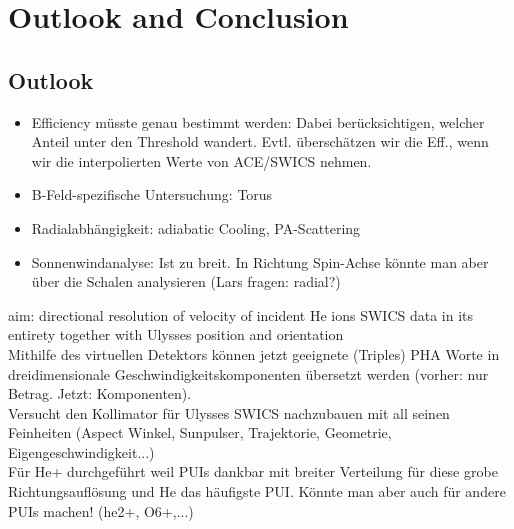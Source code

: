 
\chapter{Outlook and Conclusion} %

\label{chap:concl} %


\section{Outlook}
\begin{itemize}
	\item Efficiency müsste genau bestimmt werden: Dabei berücksichtigen, welcher Anteil unter den Threshold wandert. Evtl. überschätzen wir die Eff., wenn wir die interpolierten Werte von ACE/SWICS nehmen.
	\item B-Feld-spezifische Untersuchung: Torus
	\item Radialabhängigkeit: adiabatic Cooling, PA-Scattering
	\item Sonnenwindanalyse: Ist zu breit. In Richtung Spin-Achse könnte man aber über die Schalen analysieren (Lars fragen: radial?)
	
\end{itemize}




aim: directional resolution of velocity of incident He ions
SWICS data in its entirety
together with
Ulysses position and orientation 
\\
Mithilfe des virtuellen Detektors können jetzt geeignete (Triples) PHA Worte in dreidimensionale Geschwindigkeitskomponenten übersetzt werden (vorher: nur Betrag. Jetzt: Komponenten).
\\
Versucht den Kollimator für Ulysses SWICS nachzubauen mit all seinen Feinheiten (Aspect Winkel, Sunpulser, Trajektorie, Geometrie, Eigengeschwindigkeit...)
\\
Für He+ durchgeführt weil PUIs dankbar mit breiter Verteilung für diese grobe Richtungsauflösung und He das häufigste PUI. Könnte man aber auch für andere PUIs machen! (he2+, O6+,...)